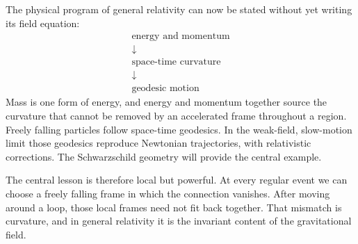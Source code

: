 The physical program of general relativity can now be stated without yet
writing its field equation:
\begin{equation}
  \begin{gathered}
    \text{energy and momentum}\\[-0.25ex]
    \downarrow\\[-0.25ex]
    \text{space-time curvature}\\[-0.25ex]
    \downarrow\\[-0.25ex]
    \text{geodesic motion}
  \end{gathered}
  \label{eq:l06-gr-program}
\end{equation}
Mass is one form of energy, and energy and momentum together source the
curvature that cannot be removed by an accelerated frame throughout a
region. Freely falling particles follow space-time geodesics. In the
weak-field, slow-motion limit those geodesics reproduce Newtonian
trajectories, with relativistic corrections. The Schwarzschild geometry
will provide the central example.

\begin{classroomqa}
\end{classroomqa}

The central lesson is therefore local but powerful. At every regular event
we can choose a freely falling frame in which the connection vanishes.
After moving around a loop, those local frames need not fit back together.
That mismatch is curvature, and in general relativity it is the invariant
content of the gravitational field.
